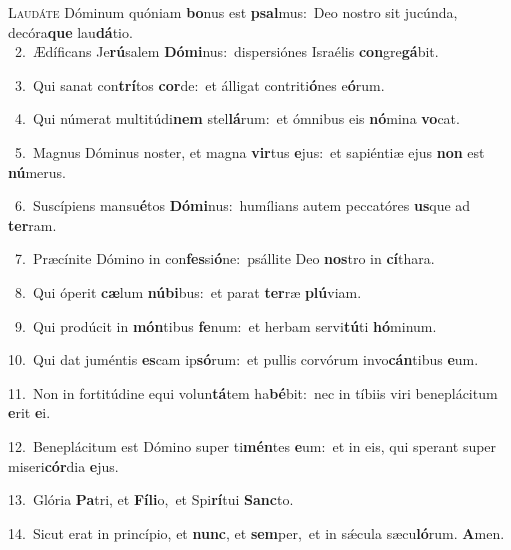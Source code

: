\lettrine{\initial\textcolor{\initialcolor}{L}}{audáte} Dóminum quóniam \textbf{bo}\-nus est \textbf{psal}\-mus:~\star Deo nostro sit jucúnda, decóra\textbf{que} lau\-\textbf{dá}\-tio.\\
{\numbfont\textcolor{\numbcolor}{~2.}}~Ædíficans Je\-\textbf{rú}\-salem \textbf{Dó}\-\textbf{mi}nus:~\star dispersiónes Israélis \textbf{con}\-gre\-\textbf{gá}\-bit.\par
{\numbfont\textcolor{\numbcolor}{~3.}}~Qui sanat con\-\textbf{trí}\-tos \textbf{cor}\-de:~\star et álligat contriti\-\textbf{ó}\-nes e\-\textbf{ó}\-rum.\par
{\numbfont\textcolor{\numbcolor}{~4.}}~Qui númerat multitúdi\textbf{nem} stel\-\textbf{lá}\-rum:~\star et ómnibus eis \textbf{nó}\-mina \textbf{vo}\-cat.\par
{\numbfont\textcolor{\numbcolor}{~5.}}~Magnus Dóminus noster, et magna \textbf{vir}\-tus \textbf{e}\-jus:~\star et sapiéntiæ ejus \textbf{non} est \textbf{nú}\-merus.\par
{\numbfont\textcolor{\numbcolor}{~6.}}~Suscípiens mansu\-\textbf{é}\-tos \textbf{Dó}\-\textbf{mi}nus:~\star humílians autem peccatóres \textbf{us}\-que ad \textbf{ter}\-ram.\par
{\numbfont\textcolor{\numbcolor}{~7.}}~Præcínite Dómino in con\-\textbf{fes}\-si\-\textbf{ó}\-ne:~\star psállite Deo \textbf{nos}\-tro in \textbf{cí}\-thara.\par
{\numbfont\textcolor{\numbcolor}{~8.}}~Qui óperit \textbf{cæ}\-lum \textbf{nú}\-\textbf{bi}bus:~\star et parat \textbf{ter}\-ræ \textbf{plú}\-viam.\par
{\numbfont\textcolor{\numbcolor}{~9.}}~Qui prodúcit in \textbf{món}\-tibus \textbf{fe}\-num:~\star et herbam servi\-\textbf{tú}\-ti \textbf{hó}\-minum.\par
{\numbfont\textcolor{\numbcolor}{10.}}~Qui dat juméntis \textbf{es}\-cam ip\-\textbf{só}\-rum:~\star et pullis corvórum invo\-\textbf{cán}\-tibus \textbf{e}\-um.\par
{\numbfont\textcolor{\numbcolor}{11.}}~Non in fortitúdine equi volun\-\textbf{tá}\-tem ha\-\textbf{bé}\-bit:~\star nec in tíbiis viri beneplácitum \textbf{e}\-rit \textbf{e}\-i.\par
{\numbfont\textcolor{\numbcolor}{12.}}~Beneplácitum est Dómino super ti\-\textbf{mén}\-tes \textbf{e}\-um:~\star et in eis, qui sperant super miseri\-\textbf{cór}\-dia \textbf{e}\-jus.\par
{\numbfont\textcolor{\numbcolor}{13.}}~Glória \textbf{Pa}\-tri, et \textbf{Fí}\-\textbf{li}o,~\star et Spi\-\textbf{rí}\-tui \textbf{Sanc}\-to.\par
{\numbfont\textcolor{\numbcolor}{14.}}~Sicut erat in princípio, et \textbf{nunc}\-, et \textbf{sem}\-per,~\star et in sǽcula sæcu\-\textbf{ló}\-rum. \textbf{A}\-men.\par
